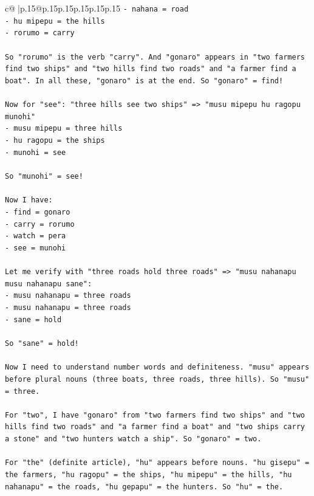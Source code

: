\documentclass{article}
\begin{document}
{\begin{supertabular}{c@{$\;$}|p{.15\linewidth}@{}p{.15\linewidth}p{.15\linewidth}p{.15\linewidth}p{.15\linewidth}p{.15\linewidth}}
{{{\texttt{{-} nahana = road} \\
\texttt{{-} hu mipepu = the hills} \\
\texttt{{-} rorumo = carry} \\
\\ 
\texttt{So "rorumo" is the verb "carry". And "gonaro" appears in "two farmers find two ships" and "two hills find two roads" and "a farmer find a boat". In all these, "gonaro" is at the end. So "gonaro" = find!} \\
\\ 
\texttt{Now for "see": "three hills see two ships" => "musu mipepu hu ragopu munohi"} \\
\texttt{{-} musu mipepu = three hills} \\
\texttt{{-} hu ragopu = the ships} \\
\texttt{{-} munohi = see} \\
\\ 
\texttt{So "munohi" = see!} \\
\\ 
\texttt{Now I have:} \\
\texttt{{-} find = gonaro} \\
\texttt{{-} carry = rorumo} \\
\texttt{{-} watch = pera} \\
\texttt{{-} see = munohi} \\
\\ 
\texttt{Let me verify with "three roads hold three roads" => "musu nahanapu musu nahanapu sane":} \\
\texttt{{-} musu nahanapu = three roads} \\
\texttt{{-} musu nahanapu = three roads} \\
\texttt{{-} sane = hold} \\
\\ 
\texttt{So "sane" = hold!} \\
\\ 
\texttt{Now I need to understand number words and definiteness. "musu" appears before plural nouns (three boats, three roads, three hills). So "musu" = three.} \\
\\ 
\texttt{For "two", I have "gonaro" from "two farmers find two ships" and "two hills find two roads" and "a farmer find a boat" and "two ships carry a stone" and "two hunters watch a ship". So "gonaro" = two.} \\
\\ 
\texttt{For "the" (definite article), "hu" appears before nouns. "hu gisepu" = the farmers, "hu ragopu" = the ships, "hu mipepu" = the hills, "hu nahanapu" = the roads, "hu gepapu" = the hunters. So "hu" = the.} \\
}}}
\end{supertabular}}
\end{document}
